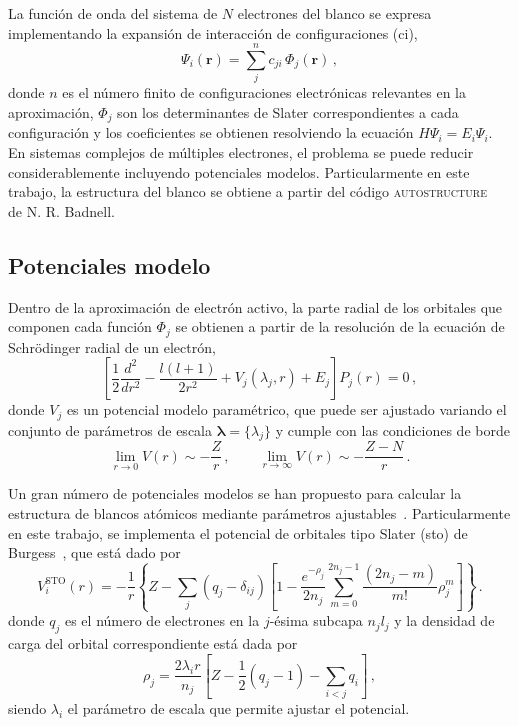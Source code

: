 La función de onda del sistema de $N$ electrones del blanco se expresa 
implementando la expansión de interacción de configuraciones (\acs{ci}),
\begin{equation*}
\Psi_i(\mathbf{r}) =
\sum_j^{n} c_{ji} \, \Phi_j(\mathbf{r})\,,
\end{equation*}
donde $n$ es el número finito de configuraciones electrónicas relevantes 
en la aproximación, $\Phi_j$ son los determinantes de Slater 
correspondientes a cada configuración y los coeficientes se obtienen 
resolviendo la ecuación $H\Psi_i=E_i\Psi_i$. En sistemas complejos de 
múltiples electrones, el problema se puede reducir considerablemente 
incluyendo potenciales modelos. 
Particularmente en este trabajo, la estructura del blanco se obtiene
a partir del código \textsc{autostructure}~\cite{Badnell:11} de 
N. R. Badnell. 

\subsection{Potenciales modelo}
\label{subsec:potmod-rmatrix}

Dentro de la aproximación de electrón activo, la parte radial 
de los orbitales que componen cada función $\Phi_j$ se obtienen a partir 
de la resolución de la ecuación de Schr\"odinger radial de un electrón,
\begin{equation*}
\left[ \frac{1}{2} \frac{d^2}{dr^2} - \frac{l(l+1)}{2r^2} 
 + V_j(\lambda_j,r) + E_j \right] P_j(r)=0\,,
\label{eq:Schro-potmod}
\end{equation*}
donde $V_j$ es un potencial modelo paramétrico, que puede ser ajustado 
variando el conjunto de parámetros de escala 
$\boldsymbol\lambda=\{\lambda_j\}$ y cumple con las condiciones de borde
\begin{equation}
\lim_{r \rightarrow 0} V(r) \sim -\frac{Z}{r} \,,\qquad
\lim_{r \rightarrow \infty} V(r) \sim -\frac{Z-N}{r} \,.
\end{equation}

Un gran número de potenciales modelos se han propuesto para calcular la 
estructura de blancos atómicos mediante parámetros 
ajustables~\cite{Hibbert:82,Gombas:56,Green:69,Klapisch:71,Phillips:59,
Herman:63,Dalgarno:70,Bayliss:77,Cowan:76,Lee:77}. 
Particularmente en este trabajo, se implementa el potencial de orbitales 
tipo Slater (\acs{sto}) de Burgess~\cite{Burgess:89}, que está dado por
\begin{equation}
V_i^{\textrm{STO}}(r)=-\frac{1}{r}\left\{Z-\sum_j(q_j-\delta_{ij})
\left[1-\frac{e^{-\rho_j}}{2n_j}\sum_{m=0}^{2n_j-1}\frac{(2n_j-m)}{m!}
\rho_j^m\right]\right\}\,.
\label{eq:STO-pot}
\end{equation}
donde $q_j$ es el número de electrones en la $j$-ésima subcapa $n_jl_j$
y la densidad de carga del orbital correspondiente está dada por
\begin{equation}
\rho_j= \frac{2\lambda_ir}{n_j}
\left[Z-\frac{1}{2}\left(q_j-1\right)-\sum_{i<j} q_i\right]\,,
\end{equation}
siendo $\lambda_i$ el parámetro de escala que permite ajustar el 
potencial. 


